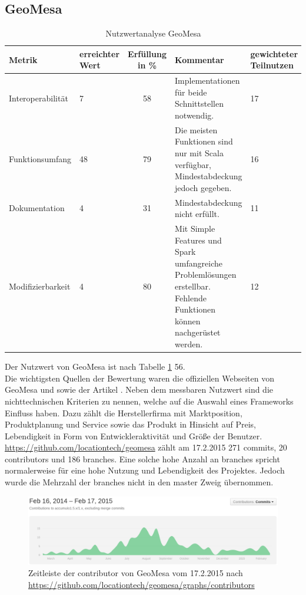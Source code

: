 \subsection{GeoMesa}
\begin{table}[h!]
\centering
\small
\begin{tabular}{l|p{1.8cm}|c|p{3.1cm}|p{1.8cm}}
\textbf{Metrik} & \textbf{erreichter Wert} & \textbf{Erfüllung in \%} & \textbf{Kommentar} & \textbf{gewichteter Teilnutzen} \\ \hline
Interoperabilität & 7 & 58 & Implementationen für beide Schnittstellen notwendig. & 17 \\ \hline
Funktionsumfang & 48 & 79 & Die meisten Funktionen sind nur mit Scala verfügbar, Mindestabdeckung jedoch gegeben. & 16 \\ \hline
Dokumentation & 4 & 31 & Mindestabdeckung nicht erfüllt. & 11 \\ \hline
Modifizierbarkeit & 4 & 80 & Mit Simple Features und Spark umfangreiche Problemlösungen erstellbar. Fehlende Funktionen können nachgerüstet werden. & 12 \\
\end{tabular}
\caption{Nutzwertanalyse GeoMesa}
\label{table:nutzwertanalyse-geomesa}
\end{table}
Der Nutzwert von GeoMesa ist nach Tabelle \ref{table:nutzwertanalyse-geomesa} 56.\\
Die wichtigsten Quellen der Bewertung waren die offiziellen Webseiten von GeoMesa \cite{website:geomesa-tutorials} und \cite{website:geomesa-simplefeatures} sowie der Artikel \cite{website:geomesaeclipse}.
Neben dem messbaren Nutzwert sind die nichttechnischen Kriterien zu nennen, welche auf die Auswahl eines Frameworks Einfluss haben.
Dazu zählt die Herstellerfirma mit Marktposition, Produktplanung und Service sowie das Produkt in Hinsicht auf Preis, Lebendigkeit in Form von Entwickleraktivität und Größe der Benutzer.\\
\url{https://github.com/locationtech/geomesa} zählt am 17.2.2015 271 commits, 20 contributors und 186 branches.
Eine solche hohe Anzahl an branches spricht normalerweise für eine hohe Nutzung und Lebendigkeit des Projektes.
Jedoch wurde die Mehrzahl der branches nicht in den master Zweig übernommen.
\begin{figure}[h!]
\centering
\includegraphics[width=\textwidth]{Abbildungen/geomesa_timeline_contributors.png}
\caption[Zeitleiste der contributor von GeoMesa]{Zeitleiste der contributor von GeoMesa vom 17.2.2015 nach \url{https://github.com/locationtech/geomesa/graphs/contributors}}
\label{fig:timeline_contr_geomesa}
\end{figure}
